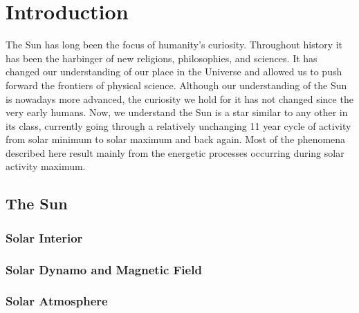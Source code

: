 \chapter{Introduction}
\label{chap:1}

The Sun has long been the focus of humanity's curiosity. Throughout history it has been the harbinger of new religions, philosophies, and sciences. It has changed our understanding of our place in the Universe and allowed us to push forward the frontiers of physical science. Although our understanding of the Sun is nowadays more advanced, the curiosity we hold for it has not changed since the very early humans.
Now, we understand the Sun is a star similar to any other in its class, currently going through a relatively unchanging 11 year cycle of activity from solar minimum to solar maximum and back again. Most of the phenomena described here result mainly from the energetic processes occurring during solar activity maximum.



\section{The Sun}\label{sec:1}


\subsection{Solar Interior}\label{sec:10}

\subsection{Solar Dynamo and Magnetic Field}\label{sec:11}

\subsection{Solar Atmosphere}\label{sec:12}

